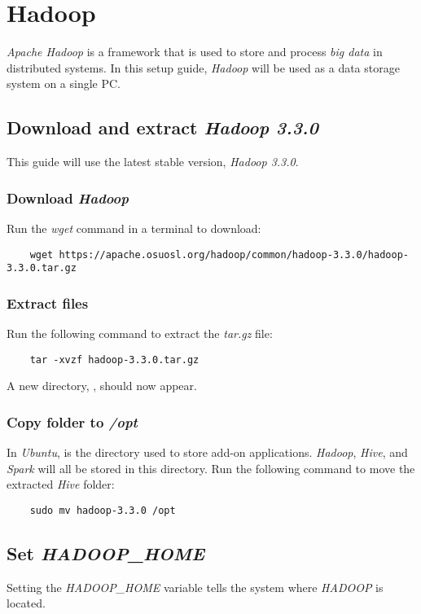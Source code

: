 \documentclass{article}
\begin{document}
\newpage
\section{Hadoop}
\emph{Apache Hadoop} is a framework that is used to store and process \emph{big data} in
distributed systems. In this setup guide, \emph{Hadoop} will be used as a data storage system on a
single PC.

  \subsection{Download and extract \emph{Hadoop 3.3.0}}
  This guide will use the latest stable version, \emph{Hadoop 3.3.0}.
  
    \subsubsection{Download \emph{Hadoop}}
    Run the \emph{wget} command in a terminal to download:
    \begin{verbatim}
    wget https://apache.osuosl.org/hadoop/common/hadoop-3.3.0/hadoop-3.3.0.tar.gz
    \end{verbatim}

    \subsubsection{Extract files}
    Run the following command to extract the \emph{tar.gz} file:
    \begin{verbatim}
    tar -xvzf hadoop-3.3.0.tar.gz
    \end{verbatim}
    A new directory, , should now appear.

    \subsubsection{Copy folder to \emph{/opt}}
    In \emph{Ubuntu},  is the directory used to store add-on applications.
    \emph{Hadoop}, \emph{Hive}, and \emph{Spark} will all be stored in this directory. Run the
    following command to move the extracted \emph{Hive} folder:
    \begin{verbatim}
    sudo mv hadoop-3.3.0 /opt
    \end{verbatim}
    
  \subsection{Set \emph{HADOOP\_HOME}}
  Setting the \emph{HADOOP\_HOME} variable tells the system where \emph{HADOOP} is located.
\end{document}
